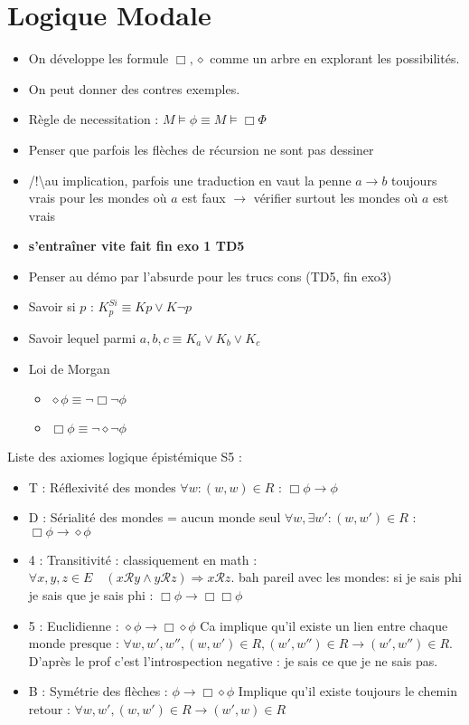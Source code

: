 \documentclass{article}
\theoremstyle{plain}%
\theoremstyle{definition}
\theoremstyle{remark}
\begin{document}
\section{Logique Modale}
\begin{itemize}
    \item On développe les formule $ \Box, \diamond  $ comme un arbre en explorant les possibilités.
    \item On peut donner des contres exemples.
    \item Règle de necessitation : $ M \models \phi \equiv M \models \Box \Phi $ 
    \item Penser que parfois les flèches de récursion ne sont pas dessiner
    \item /!\textbackslash  au implication, parfois une traduction en vaut la penne $ a \to b $ toujours vrais pour les mondes où $ a $ est faux $\rightarrow$ vérifier surtout les mondes où $ a $ est vrais
    \item \textbf{s'entraîner vite fait fin exo 1 TD5}
    \item Penser au démo par l'absurde pour les trucs cons (TD5, fin exo3)
    \item Savoir si $ p $ :  $ K^{Si}_p \equiv K p \vee K \neg p $ 
    \item Savoir lequel parmi $ a,b,c \equiv K_a \vee K_b \vee K_c $ 
    \item Loi de Morgan \begin{itemize}
        \item $ \diamond \phi \equiv \neg \Box \neg \phi  $ 
        \item $ \Box \phi \equiv \neg \diamond \neg \phi  $ 
    \end{itemize}
\end{itemize}
Liste des axiomes logique épistémique S5 :
\begin{itemize}
    \item T : Réflexivité des mondes $ \forall w : (w,w) \in R $ : $ \Box \phi \to \phi  $ 
    \item D : Sérialité des mondes = aucun monde seul $ \forall w, \exists w' : (w, w') \in R $  : $ \Box \phi \to \diamond \phi  $ 
    \item 4 : Transitivité : classiquement en math : $ \forall x,y,z\in E\quad (x{\mathcal {R}}y\land y{\mathcal {R}}z)\Rightarrow x{\mathcal {R}}z. $ bah pareil avec les mondes: si je sais phi je sais que je sais phi : $ \Box \phi \to \Box \Box \phi  $ 
    \item 5 : Euclidienne : $ \diamond \phi  \to  \Box \diamond \phi  $ Ca implique qu'il existe un lien entre chaque monde presque : $ \forall w, w', w'', (w, w') \in R, (w',w'') \in R \to (w',w'') \in R $. D'après le prof c'est l'introspection negative : je sais ce que je ne sais pas.
    \item B : Symétrie des flèches : $ \phi \to \Box \diamond \phi  $ Implique qu'il existe toujours le chemin retour : $ \forall w, w', (w,w') \in R \to (w',w) \in R $ 
\end{itemize}
\end{document}
